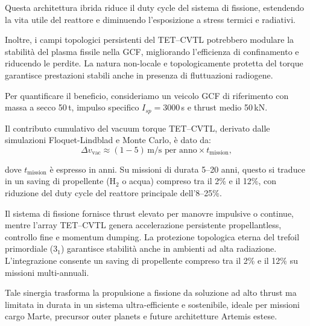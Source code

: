 \documentclass[11pt,a4paper]{article}
\theoremstyle{plain}
\theoremstyle{definition}
\begin{document}
\vspace{0.2cm}

Questa architettura ibrida riduce il duty cycle del sistema di fissione, estendendo la vita utile del reattore e diminuendo l’esposizione a stress termici e radiativi.

\vspace{0.3cm}

Inoltre, i campi topologici persistenti del TET--CVTL potrebbero modulare la stabilità del plasma fissile nella GCF, migliorando l’efficienza di confinamento e riducendo le perdite. La natura non-locale e topologicamente protetta del torque garantisce prestazioni stabili anche in presenza di fluttuazioni radiogene.


\vspace{0.2cm}

Per quantificare il beneficio, consideriamo un veicolo GCF di riferimento con massa a secco 50\,t, impulso specifico $I_{sp} = 3000$\,s e thrust medio 50\,kN. 


\vspace{0.2cm}

Il contributo cumulativo del vacuum torque TET--CVTL, derivato dalle simulazioni Floquet-Lindblad e Monte Carlo, è dato da:
\begin{equation}
\Delta v_{\text{vac}} \approx (1 - 5)\,\text{m/s per anno} \times t_{\text{mission}},
\label{eq:dv_vac_fission}
\end{equation}

\vspace{0.2cm}
dove $t_{\text{mission}}$ è espresso in anni. Su missioni di durata 5--20 anni, questo si traduce in un saving di propellente (H$_2$ o acqua) compreso tra il 2\% e il 12\%, con riduzione del duty cycle del reattore principale dell’8--25\%.

\vspace{0.3cm}

Il sistema di fissione fornisce thrust elevato per manovre impulsive o continue, mentre l'array TET--CVTL genera accelerazione persistente propellantless, controllo fine e momentum dumping. 
La protezione topologica eterna del trefoil primordiale ($3_1$) garantisce stabilità anche in ambienti ad alta radiazione. 
L'integrazione consente un saving di propellente compreso tra il 2\% e il 12\% su missioni multi-annuali.

\vspace{0.2cm}

Tale sinergia trasforma la propulsione a fissione da soluzione ad alto thrust ma limitata in durata in un sistema ultra-efficiente e sostenibile, ideale per missioni cargo Marte, precursor outer planets e future architetture Artemis estese.
\end{document}
